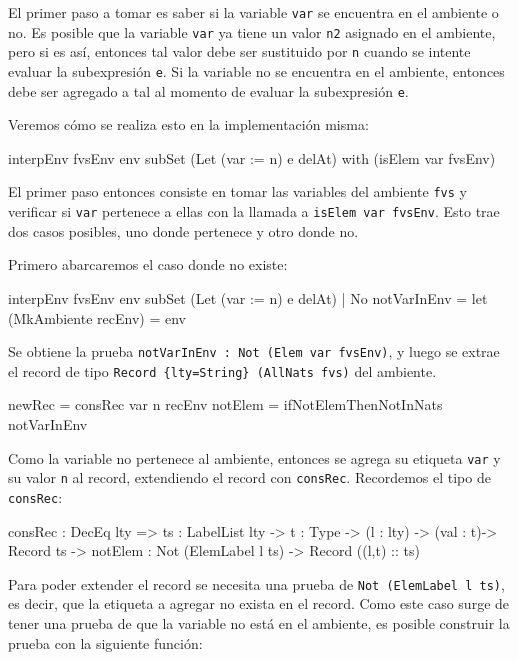 El primer paso a tomar es saber si la variable \texttt{var} se encuentra en el ambiente o no. Es posible que la variable \texttt{var} ya tiene un valor \texttt{n2} asignado en el ambiente, pero si es así, entonces tal valor debe ser sustituido por \texttt{n} cuando se intente evaluar la subexpresión \texttt{e}. Si la variable no se encuentra en el ambiente, entonces debe ser agregado a tal al momento de evaluar la subexpresión \texttt{e}.

Veremos cómo se realiza esto en la implementación misma:

\begin{code}
interpEnv {fvsEnv} env subSet (Let (var := n) e delAt) 
    with (isElem var fvsEnv)
\end{code}

El primer paso entonces consiste en tomar las variables del ambiente \texttt{fvs} y verificar si \texttt{var} pertenece a ellas con la llamada a \texttt{isElem var fvsEnv}. Esto trae dos casos posibles, uno donde pertenece y otro donde no.

Primero abarcaremos el caso donde no existe:

\begin{code}
interpEnv {fvsEnv} env subSet (Let (var := n) e delAt) 
    | No notVarInEnv = 
    let (MkAmbiente recEnv) = env
\end{code}

Se obtiene la prueba \texttt{notVarInEnv : Not (Elem var fvsEnv)}, y luego se extrae el record de tipo \texttt{Record \{lty=String\} (AllNats fvs)} del ambiente.

\begin{code}
newRec = consRec var n recEnv
  {notElem = ifNotElemThenNotInNats notVarInEnv}
\end{code}

Como la variable no pertenece al ambiente, entonces se agrega su etiqueta \texttt{var} y su valor \texttt{n} al record, extendiendo el record con \texttt{consRec}. Recordemos el tipo de \texttt{consRec}:

\begin{code}
consRec : DecEq lty => {ts : LabelList lty} -> {t : Type} -> 
  (l : lty) -> (val : t)->  Record ts -> 
  {notElem : Not (ElemLabel l ts)} -> Record ((l,t) :: ts)
\end{code}

Para poder extender el record se necesita una prueba de \texttt{Not (ElemLabel l ts)}, es decir, que la etiqueta a agregar no exista en el record. Como este caso surge de tener una prueba de que la variable no está en el ambiente, es posible construir la prueba con la siguiente función:

